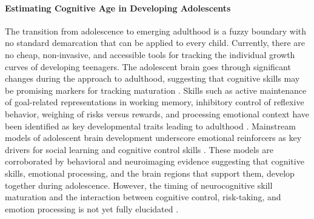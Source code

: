 \documentclass{article}%
\begin{document}
\paragraph*{Estimating Cognitive Age in Developing Adolescents}
The transition from adolescence to emerging adulthood is a fuzzy boundary with no standard demarcation that can be applied to every child. Currently, there are no cheap, non-invasive, and accessible tools for tracking the individual growth curves of developing teenagers. The adolescent brain goes through significant changes during the approach to adulthood, suggesting that cognitive skills may be promising markers for tracking maturation \citep{shulman2016dual}. Skills such as active maintenance of goal-related representations in working memory, inhibitory control of reflexive behavior, weighing of risks versus rewards, and processing emotional context  have been identified as key developmental traits leading to adulthood \citep{luna2015}. Mainstream models of adolescent brain development underscore emotional reinforcers as key drivers for social learning and cognitive control skills \citep{jones2014adolescent, rosenbaum2020valence}. These models are corroborated by behavioral and neuroimaging evidence suggesting that cognitive skills, emotional processing, and the brain regions that support them, develop together during adolescence.  However, the timing of neurocognitive skill maturation and the interaction between cognitive control, risk-taking, and emotion processing is not yet fully elucidated \citep{shulman2016dual, duell2016interaction}.
\end{document}
